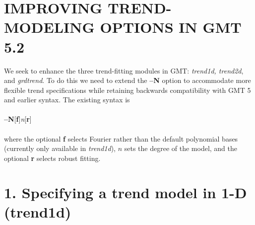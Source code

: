 \documentclass[12pt,letterpaper,margin=0.5in]{report}
\begin{document}
\section*{IMPROVING TREND-MODELING OPTIONS IN GMT 5.2}

We seek to enhance the three trend-fitting modules in GMT: {\it trend1d, trend2d}, and {\it grdtrend}.
To do this we need to extend the {\bf --N} option to accommodate more flexible trend specifications
while retaining backwards compatibility with GMT 5 and earlier syntax.  The existing syntax is
\\ \\
{\bf --N}[{\bf f}]{\it n}[{\bf r}]
\\ \\
where the optional {\bf f} selects Fourier rather than the default polynomial bases (currently only available in {\it trend1d}), $n$ sets the degree of
the model, and the optional {\bf r} selects robust fitting.

\section*{1. Specifying a trend model in 1-D (trend1d)}
\end{document}
